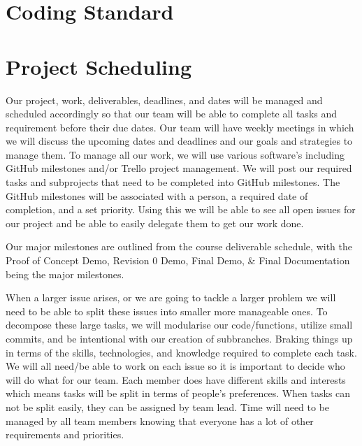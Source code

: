 \documentclass{article}
\begin{document}
\section{Coding Standard}

\section{Project Scheduling}

	Our project, work, deliverables, deadlines, and dates will be managed and scheduled accordingly so that our team will be able to complete all tasks and requirement before their due dates. Our team will have weekly meetings in which we will discuss the upcoming dates and deadlines and our goals and strategies to manage them. To manage all our work, we will use various software’s including GitHub milestones and/or Trello project management. We will post our required tasks and subprojects that need to be completed into GitHub milestones. The GitHub milestones will be associated with a person, a required date of completion, and a set priority. Using this we will be able to see all open issues for our project and be able to easily delegate them to get our work done. 

	Our major milestones are outlined from the course deliverable schedule, with the Proof of Concept Demo, Revision 0 Demo, Final Demo, \& Final Documentation being the major milestones. 

	When a larger issue arises, or we are going to tackle a larger problem we will need to be able to split these issues into smaller more manageable ones. To decompose these large tasks, we will modularise our code/functions, utilize small commits, and be intentional with our creation of subbranches. Braking things up in terms of the skills, technologies, and knowledge required to complete each task. We will all need/be able to work on each issue so it is important to decide who will do what for our team. Each member does have different skills and interests which means tasks will be split in terms of people’s preferences. When tasks can not be split easily, they can be assigned by team lead. Time will need to be managed by all team members knowing that everyone has a lot of other requirements and priorities.
\end{document}

